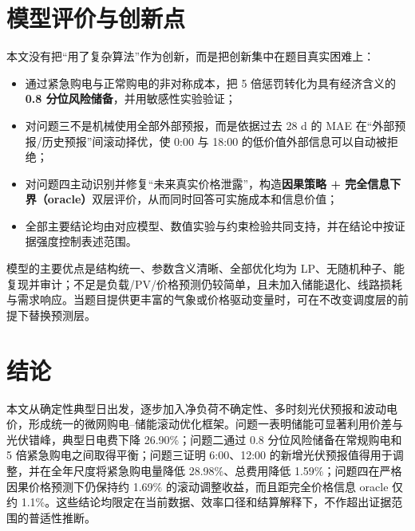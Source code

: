 \section{模型评价与创新点}

本文没有把“用了复杂算法”作为创新，而是把创新集中在题目真实困难上：

\begin{itemize}
\item 通过紧急购电与正常购电的非对称成本，把 5 倍惩罚转化为具有经济含义的 \textbf{0.8 分位风险储备}，并用敏感性实验验证；
\item 对问题三不是机械使用全部外部预报，而是依据过去 28 d 的 MAE 在“外部预报/历史预报”间滚动择优，使 0:00 与 18:00 的低价值外部信息可以自动被拒绝；
\item 对问题四主动识别并修复“未来真实价格泄露”，构造\textbf{因果策略 + 完全信息下界（oracle）}双层评价，从而同时回答可实施成本和信息价值；
\item 全部主要结论均由对应模型、数值实验与约束检验共同支持，并在结论中按证据强度控制表述范围。
\end{itemize}

模型的主要优点是结构统一、参数含义清晰、全部优化均为 LP、无随机种子、能复现并审计；不足是负载/PV/价格预测仍较简单，且未加入储能退化、线路损耗与需求响应。当题目提供更丰富的气象或价格驱动变量时，可在不改变调度层的前提下替换预测层。

\section{结论}

本文从确定性典型日出发，逐步加入净负荷不确定性、多时刻光伏预报和波动电价，形成统一的微网购电--储能滚动优化框架。问题一表明储能可显著利用价差与光伏错峰，典型日电费下降 26.90\%；问题二通过 0.8 分位风险储备在常规购电和 5 倍紧急购电之间取得平衡；问题三证明 6:00、12:00 的新增光伏预报值得用于调整，并在全年尺度将紧急购电量降低 28.98\%、总费用降低 1.59\%；问题四在严格因果价格预测下仍保持约 1.69\% 的滚动调整收益，而且距完全价格信息 oracle 仅约 1.1\%。这些结论均限定在当前数据、效率口径和结算解释下，不作超出证据范围的普适性推断。
